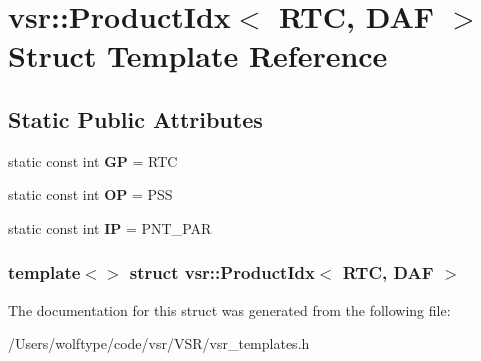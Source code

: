 \hypertarget{structvsr_1_1_product_idx_3_01_r_t_c_00_01_d_a_f_01_4}{\section{vsr\-:\-:Product\-Idx$<$ R\-T\-C, D\-A\-F $>$ Struct Template Reference}
\label{structvsr_1_1_product_idx_3_01_r_t_c_00_01_d_a_f_01_4}
}
\subsection*{Static Public Attributes}
\begin{DoxyCompactItemize}
\item 
\hypertarget{structvsr_1_1_product_idx_3_01_r_t_c_00_01_d_a_f_01_4_a74d16cefe52222af3fff440b25eb4ee3}{static const int {\bfseries G\-P} = R\-T\-C}\label{structvsr_1_1_product_idx_3_01_r_t_c_00_01_d_a_f_01_4_a74d16cefe52222af3fff440b25eb4ee3}

\item 
\hypertarget{structvsr_1_1_product_idx_3_01_r_t_c_00_01_d_a_f_01_4_a4e1492d294a55cc25a984eaf97e2d038}{static const int {\bfseries O\-P} = P\-S\-S}\label{structvsr_1_1_product_idx_3_01_r_t_c_00_01_d_a_f_01_4_a4e1492d294a55cc25a984eaf97e2d038}

\item 
\hypertarget{structvsr_1_1_product_idx_3_01_r_t_c_00_01_d_a_f_01_4_a9352ab7be78a066e402a90624df40cda}{static const int {\bfseries I\-P} = P\-N\-T\-\_\-\-P\-A\-R}\label{structvsr_1_1_product_idx_3_01_r_t_c_00_01_d_a_f_01_4_a9352ab7be78a066e402a90624df40cda}

\end{DoxyCompactItemize}
\subsubsection*{template$<$$>$ struct vsr\-::\-Product\-Idx$<$ R\-T\-C, D\-A\-F $>$}



The documentation for this struct was generated from the following file\-:\begin{DoxyCompactItemize}
\item 
/\-Users/wolftype/code/vsr/\-V\-S\-R/vsr\-\_\-templates.\-h\end{DoxyCompactItemize}
